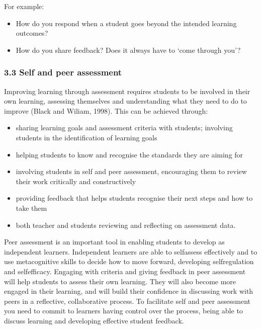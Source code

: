 \documentclass[letterpaper,10pt,english]{sphinxmanual}
\begin{document}
For example:
\begin{itemize}
\item {} 
How do you respond when a student goes beyond the intended learning outcomes?

\item {} 
How do you share feedback? Does it always have to ‘come through you’?

\end{itemize}


\subsubsection{3.3 Self and peer assessment}
\label{\detokenize{content/session_00/Part_00_03:3.3-Self-and-peer-assessment}}
Improving learning through assessment requires students to be involved in their own learning, assessing themselves and understanding what they need to do to improve (Black and Wiliam, 1998). This can be achieved through:
\begin{itemize}
\item {} 
sharing learning goals and assessment criteria with students; involving students in the identification of learning goals

\item {} 
helping students to know and recognise the standards they are aiming for

\item {} 
involving students in self and peer assessment, encouraging them to review their work critically and constructively

\item {} 
providing feedback that helps students recognise their next steps and how to take them

\item {} 
both teacher and students reviewing and reflecting on assessment data.

\end{itemize}

Peer assessment is an important tool in enabling students to develop as independent learners. Independent learners are able to self\sphinxhyphen{}assess effectively and to use metacognitive skills to decide how to move forward, developing self\sphinxhyphen{}regulation and self\sphinxhyphen{}efficacy. Engaging with criteria and giving feedback in peer assessment will help students to assess their own learning. They will also become more engaged in their learning, and will build their confidence in discussing work with peers in a
reflective, collaborative process. To facilitate self and peer assessment you need to commit to learners having control over the process, being able to discuss learning and developing effective student feedback.
\end{document}

